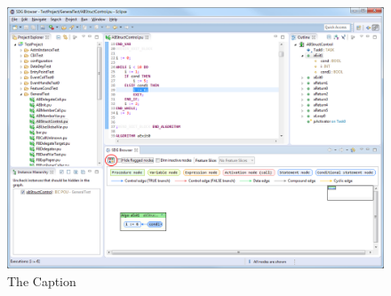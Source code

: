 \begin{figure}[hp]
  \centering
    \includegraphics[scale=0.43]{bilder/manual-legend}
  \caption{The Caption}
  \label{fig:manual-legend}
\end{figure}
